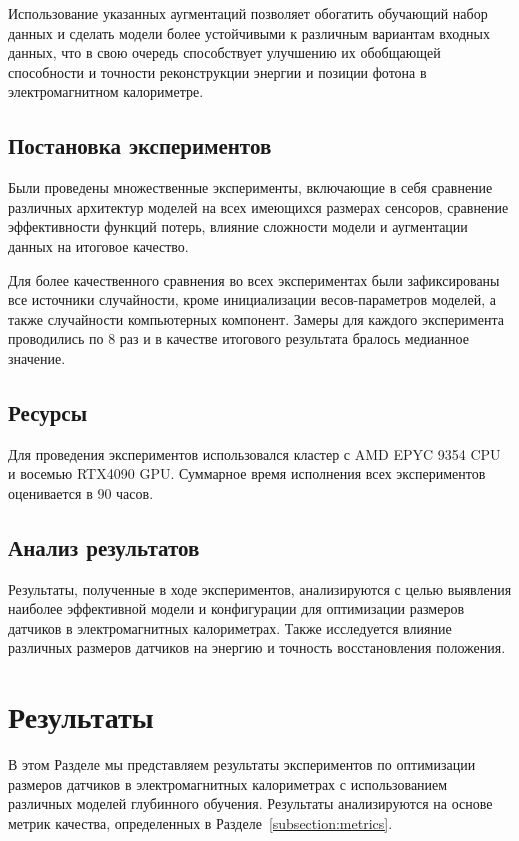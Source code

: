 \documentclass[a4paper,12pt]{extarticle}
\begin{document}
Использование указанных аугментаций позволяет обогатить обучающий набор данных и сделать модели более устойчивыми к различным вариантам входных данных, что в свою очередь способствует улучшению их обобщающей способности и точности реконструкции энергии и позиции фотона в электромагнитном калориметре.

\subsection{Постановка экспериментов}

Были проведены множественные эксперименты, включающие в себя сравнение различных архитектур моделей на всех имеющихся размерах сенсоров, сравнение эффективности функций потерь, влияние сложности модели и аугментации данных на итоговое качество.

Для более качественного сравнения во всех экспериментах были зафиксированы все источники случайности, кроме инициализации весов-параметров моделей, а также случайности компьютерных компонент. Замеры для каждого эксперимента проводились по $8$ раз и в качестве итогового результата бралось медианное значение.

\subsection{Ресурсы}

Для проведения экспериментов использовался кластер с AMD EPYC 9354 CPU и восемью RTX4090 GPU. Суммарное время исполнения всех экспериментов оценивается в $90$ часов.

\subsection{Анализ результатов}

Результаты, полученные в ходе экспериментов, анализируются с целью выявления наиболее эффективной модели и конфигурации для оптимизации размеров датчиков в электромагнитных калориметрах. Также исследуется влияние различных размеров датчиков на энергию и точность восстановления положения.

\section{Результаты}
\label{section:results}

В этом Разделе мы представляем результаты экспериментов по оптимизации размеров датчиков в электромагнитных калориметрах с использованием различных моделей глубинного обучения. Результаты анализируются на основе метрик качества, определенных в Разделе~\ref{subsection:metrics}.
\end{document}
